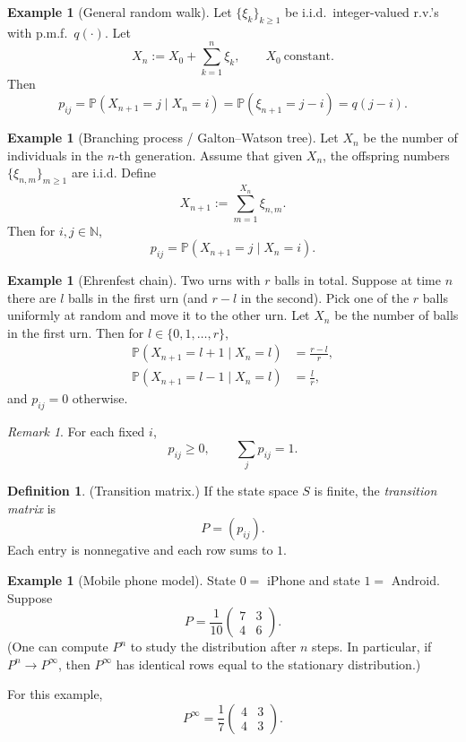 \documentclass[11pt]{article}
\theoremstyle{plain}
\theoremstyle{definition}
\newtheorem{definition}[theorem]{Definition}
\newtheorem{example}[theorem]{Example}
\theoremstyle{remark}
\newtheorem{remark}[theorem]{Remark}
\newcommand{\N}{\mathbb{N}}
\begin{document}
	
	
	\begin{example}[General random walk]
		Let \(\{\xi_k\}_{k\ge 1}\) be i.i.d.\ integer-valued r.v.'s with p.m.f.\ \(q(\cdot)\).
		Let
		\[
		X_n:=X_0+\sum_{k=1}^n \xi_k,\qquad X_0\ \text{constant}.
		\]
		Then
		\[
		p_{ij}
		=\mathbb{P}(X_{n+1}=j\mid X_n=i)
		=\mathbb{P}(\xi_{n+1}=j-i)
		=q(j-i).
		\]
	\end{example}
	
	\begin{example}[Branching process / Galton--Watson tree]
		Let \(X_n\) be the number of individuals in the \(n\)-th generation.
		Assume that given \(X_n\), the offspring numbers \(\{\xi_{n,m}\}_{m\ge 1}\) are i.i.d.
		Define
		\[
		X_{n+1}:=\sum_{m=1}^{X_n}\xi_{n,m}.
		\]
		Then for \(i,j\in\N\),
		\[
		p_{ij}=\mathbb{P}(X_{n+1}=j\mid X_n=i).
		\]
	\end{example}
	
	\begin{example}[Ehrenfest chain]
		Two urns with \(r\) balls in total. Suppose at time \(n\) there are \(l\) balls in the first urn
		(and \(r-l\) in the second). Pick one of the \(r\) balls uniformly at random and move it to the other urn.
		Let \(X_n\) be the number of balls in the first urn. Then for \(l\in\{0,1,\dots,r\}\),
		\begin{align*}
			\mathbb{P}(X_{n+1}=l+1\mid X_n=l) &= \frac{r-l}{r},\\
			\mathbb{P}(X_{n+1}=l-1\mid X_n=l) &= \frac{l}{r},
		\end{align*}
		and \(p_{ij}=0\) otherwise.
	\end{example}
	
	
	
	\begin{remark}
		For each fixed \(i\),
		\[
		p_{ij}\ge 0,
		\qquad
		\sum_j p_{ij}=1.
		\]
	\end{remark}
	
	\begin{definition}
		(Transition matrix.)
		If the state space \(S\) is finite, the \emph{transition matrix} is
		\[
		P=(p_{ij}).
		\]
		Each entry is nonnegative and each row sums to \(1\).
	\end{definition}
	
	\begin{example}[Mobile phone model]
		State \(0=\) iPhone and state \(1=\) Android. Suppose
		\[
		P=\frac{1}{10}
		\begin{pmatrix}
			7 & 3\\
			4 & 6
		\end{pmatrix}.
		\]
		(One can compute \(P^n\) to study the distribution after \(n\) steps. In particular, if \(P^n\to P^\infty\),
		then \(P^\infty\) has identical rows equal to the stationary distribution.)
		
		For this example,
		\[
		P^\infty=\frac{1}{7}
		\begin{pmatrix}
			4 & 3\\
			4 & 3
		\end{pmatrix}.
		\]
	\end{example}
	
\end{document}
